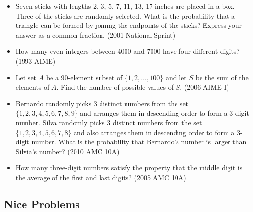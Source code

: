 \documentclass{article}
\begin{document}
\begin{itemize}
\item Seven sticks with lengths 2, 3, 5, 7, 11, 13, 17 inches are placed in a box. Three of the sticks are randomly selected. What is the probability that a triangle can be formed by joining the endpoints of the sticks? Express your answer as a common fraction. (2001 National Sprint)

\item How many even integers between 4000 and 7000 have four different digits? (1993 AIME)

\item Let set $A$ be a 90-element subset of $\{ 1, 2, \ldots, 100\}$ and let $S$ be the sum of the elements of $A$. Find the number of possible values of $S$. (2006 AIME I)

\item Bernardo randomly picks 3 distinct numbers from the set $\{ 1, 2, 3, 4, 5, 6, 7, 8, 9\}$ and arranges them in descending order to form a 3-digit number. Silva randomly picks 3 distinct numbers from the set $\{ 1, 2, 3, 4, 5, 6, 7, 8\}$ and also arranges them in descending order to form a 3-digit number. What is the probability that Bernardo's number is larger than Silvia's number? (2010 AMC 10A)

\item How many three-digit numbers satisfy the property that the middle digit is the average of the first and last digits? (2005 AMC 10A)

\end{itemize}


\subsection{Nice Problems}
\end{document}
